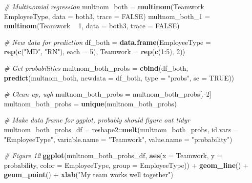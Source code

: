 \documentclass[]{book}
\newenvironment{Shaded}{\begin{snugshade}}{\end{snugshade}}
\newcommand{\KeywordTok}[1]{\textcolor[rgb]{0.13,0.29,0.53}{\textbf{{#1}}}}
\newcommand{\DataTypeTok}[1]{\textcolor[rgb]{0.13,0.29,0.53}{{#1}}}
\newcommand{\DecValTok}[1]{\textcolor[rgb]{0.00,0.00,0.81}{{#1}}}
\newcommand{\StringTok}[1]{\textcolor[rgb]{0.31,0.60,0.02}{{#1}}}
\newcommand{\CommentTok}[1]{\textcolor[rgb]{0.56,0.35,0.01}{\textit{{#1}}}}
\newcommand{\OtherTok}[1]{\textcolor[rgb]{0.56,0.35,0.01}{{#1}}}
\newcommand{\NormalTok}[1]{{#1}}
\begin{document}
\begin{Shaded}
\begin{Highlighting}[]
\CommentTok{# Multinomial regression}
\NormalTok{multnom_both =}\StringTok{ }\KeywordTok{multinom}\NormalTok{(Teamwork ~}\StringTok{ }\NormalTok{EmployeeType, }\DataTypeTok{data =} \NormalTok{both3, }\DataTypeTok{trace =} \OtherTok{FALSE}\NormalTok{)}
\NormalTok{multnom_both_1 =}\StringTok{ }\KeywordTok{multinom}\NormalTok{(Teamwork ~}\StringTok{ }\DecValTok{1}\NormalTok{, }\DataTypeTok{data =} \NormalTok{both3, }\DataTypeTok{trace =} \OtherTok{FALSE}\NormalTok{)}

\CommentTok{# New data for prediction}
\NormalTok{df_both =}\StringTok{ }\KeywordTok{data.frame}\NormalTok{(}\DataTypeTok{EmployeeType =} \KeywordTok{rep}\NormalTok{(}\KeywordTok{c}\NormalTok{(}\StringTok{"MD"}\NormalTok{, }\StringTok{"RN"}\NormalTok{), }\DataTypeTok{each =} \DecValTok{5}\NormalTok{),  }
  \DataTypeTok{Teamwork =} \KeywordTok{rep}\NormalTok{(}\KeywordTok{c}\NormalTok{(}\DecValTok{1}\NormalTok{:}\DecValTok{5}\NormalTok{), }\DecValTok{2}\NormalTok{))}

\CommentTok{# Get probabilities}
\NormalTok{multnom_both_probs =}\StringTok{ }\KeywordTok{cbind}\NormalTok{(df_both, }\KeywordTok{predict}\NormalTok{(multnom_both, }
  \DataTypeTok{newdata =} \NormalTok{df_both, }\DataTypeTok{type =} \StringTok{"probs"}\NormalTok{, }\DataTypeTok{se =} \OtherTok{TRUE}\NormalTok{))}

\CommentTok{# Clean up, ugh}
\NormalTok{multnom_both_probs =}\StringTok{ }\NormalTok{multnom_both_probs[,-}\DecValTok{2}\NormalTok{]}
\NormalTok{multnom_both_probs =}\StringTok{ }\KeywordTok{unique}\NormalTok{(multnom_both_probs)}

\CommentTok{# Make data frame for ggplot, probably should figure out tidyr}
\NormalTok{multnom_both_probs_df =}\StringTok{ }\NormalTok{reshape2::}\KeywordTok{melt}\NormalTok{(multnom_both_probs, }
  \DataTypeTok{id.vars =} \StringTok{"EmployeeType"}\NormalTok{, }\DataTypeTok{variable.name =} \StringTok{"Teamwork"}\NormalTok{, }
  \DataTypeTok{value.name =} \StringTok{"probability"}\NormalTok{)}

\CommentTok{# Figure 12}
\KeywordTok{ggplot}\NormalTok{(multnom_both_probs_df, }\KeywordTok{aes}\NormalTok{(}\DataTypeTok{x =} \NormalTok{Teamwork, }\DataTypeTok{y =} \NormalTok{probability, }
    \DataTypeTok{color =} \NormalTok{EmployeeType, }\DataTypeTok{group =} \NormalTok{EmployeeType)) +}
\StringTok{  }\KeywordTok{geom_line}\NormalTok{() +}\StringTok{ }
\StringTok{  }\KeywordTok{geom_point}\NormalTok{() +}
\StringTok{  }\KeywordTok{xlab}\NormalTok{(}\StringTok{"My team works well together"}\NormalTok{)}
\end{Highlighting}
\end{Shaded}
\end{document}
